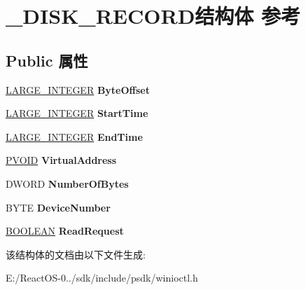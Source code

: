 \hypertarget{struct___d_i_s_k___r_e_c_o_r_d}{}\section{\+\_\+\+D\+I\+S\+K\+\_\+\+R\+E\+C\+O\+R\+D结构体 参考}
\label{struct___d_i_s_k___r_e_c_o_r_d}
\subsection*{Public 属性}
\begin{DoxyCompactItemize}
\item 
\mbox{\label{struct___d_i_s_k___r_e_c_o_r_d_a1e0b3582f531cd2d509fc1fff49b3b26}} 
\hyperlink{union___l_a_r_g_e___i_n_t_e_g_e_r}{L\+A\+R\+G\+E\+\_\+\+I\+N\+T\+E\+G\+ER} {\bfseries Byte\+Offset}
\item 
\mbox{\label{struct___d_i_s_k___r_e_c_o_r_d_ac949a9572dceb372a038088c526163ea}} 
\hyperlink{union___l_a_r_g_e___i_n_t_e_g_e_r}{L\+A\+R\+G\+E\+\_\+\+I\+N\+T\+E\+G\+ER} {\bfseries Start\+Time}
\item 
\mbox{\label{struct___d_i_s_k___r_e_c_o_r_d_aba6cb4c527faa94bcee1c29dbe276a08}} 
\hyperlink{union___l_a_r_g_e___i_n_t_e_g_e_r}{L\+A\+R\+G\+E\+\_\+\+I\+N\+T\+E\+G\+ER} {\bfseries End\+Time}
\item 
\mbox{\label{struct___d_i_s_k___r_e_c_o_r_d_a6d1399cdbe5a3dcf583f1b24e58e58f8}} 
\hyperlink{interfacevoid}{P\+V\+O\+ID} {\bfseries Virtual\+Address}
\item 
\mbox{\label{struct___d_i_s_k___r_e_c_o_r_d_af2567ecc9f895a3ff037b01036dbb5d0}} 
D\+W\+O\+RD {\bfseries Number\+Of\+Bytes}
\item 
\mbox{\label{struct___d_i_s_k___r_e_c_o_r_d_ae7aac3fe35c755413c788691693a23fd}} 
B\+Y\+TE {\bfseries Device\+Number}
\item 
\mbox{\label{struct___d_i_s_k___r_e_c_o_r_d_a9cdbc6c31837c501336a3e24162892fd}} 
\hyperlink{_processor_bind_8h_a112e3146cb38b6ee95e64d85842e380a}{B\+O\+O\+L\+E\+AN} {\bfseries Read\+Request}
\end{DoxyCompactItemize}


该结构体的文档由以下文件生成\+:\begin{DoxyCompactItemize}
\item 
E\+:/\+React\+O\+S-\/0../sdk/include/psdk/winioctl.\+h\end{DoxyCompactItemize}
